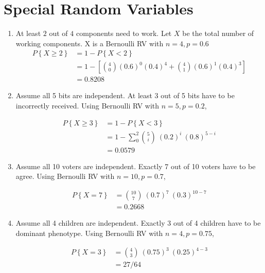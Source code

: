 \chapter{Special Random Variables}

\begin{enumerate}
	\item At least $ 2 $ out of $ 4 $ components need to work. Let $ X $ be the total number of working components. X is a Bernoulli RV with $ n = 4, p = 0.6 $\\
	
	
		\begin{align}
			P \left\{X \geq 2 \right\} &= 1 - P \left\{X < 2 \right\} \\
			&= 1 - \left[\binom{4}{0} (0.6)^0 (0.4)^4 + \binom{4}{1} (0.6)^1 (0.4)^3\right] \nonumber \\
			&= 0.8208 \nonumber
		\end{align}
	
	
	\item Assume all 5 bits are independent.  At least 3 out of 5 bits have to be incorrectly received. Using Bernoulli RV with $ n = 5, p = 0.2 $,
	
	
		\begin{align}
			P \left\{X \geq 3 \right\} &= 1 - P \left\{X < 3 \right\} \\
			&= 1 - \sum\limits_{0}^{2} \binom{5}{i}\ (0.2)^i\ (0.8)^{5-i} \nonumber \\
			&= 0.0579 \nonumber
		\end{align}
	
	
	\item Assume all 10 voters are independent.  Exactly 7 out of 10 voters have to be agree. Using Bernoulli RV with $ n = 10, p = 0.7 $,
	
	
		\begin{align}
			P \left\{X = 7 \right\} &= \binom{10}{7}\ (0.7)^7\ (0.3)^{10-7}  \\
			&= 0.2668 \nonumber
		\end{align}
	 
	
	\item Assume all 4 children are independent. Exactly 3 out of 4 children have to be dominant phenotype. Using Bernoulli RV with $ n = 4, p = 0.75 $,
	
	
		\begin{align}
			P \left\{X = 3 \right\} &= \binom{4}{3}\ (0.75)^3\ (0.25)^{4-3}  \\
			&= 27/64 \nonumber
		\end{align}
	 

\end{enumerate}

